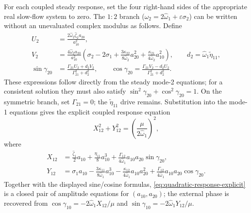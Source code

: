 \documentclass[11pt]{article}
\begin{document}
For each coupled steady response, set the four right-hand sides of the appropriate real slow-flow system to zero. The $1{:}2$ branch ($\hat{\omega}_2=2\hat{\omega}_1+\varepsilon\sigma_2$) can be written without an unevaluated complex modulus as follows. Define
\begin{align*}
U_2&=\frac{2\hat{\omega}_2\hat{\zeta}_2a_{20}}{a_{10}^2},\\
V_2&=\frac{4\hat{\omega}_2a_{20}}{a_{10}^2}\left(\sigma_2-2\sigma_1+\frac{3\kappa_{22}}{8\hat{\omega}_2}a_{20}^2+\frac{\kappa_{21}}{4\hat{\omega}_2}a_{10}^2\right),\qquad d_2=\hat{\omega}_1\tilde{\eta}_{11},\\
\sin\gamma_{20}&=\frac{\Gamma_{21}U_2+d_2V_2}{\Gamma_{21}^2+d_2^2},\qquad
\cos\gamma_{20}=\frac{\Gamma_{21}V_2-d_2U_2}{\Gamma_{21}^2+d_2^2}.
\end{align*}
These expressions follow directly from the steady mode-2 equations; for a consistent solution they must also satisfy $\sin^2\gamma_{20}+\cos^2\gamma_{20}=1$. On the symmetric branch, set $\Gamma_{21}=0$; the $\tilde{\eta}_{11}$ drive remains. Substitution into the mode-1 equations gives the explicit coupled response equation
\begin{equation}\label{eq:quadratic-response-explicit}
X_{12}^2+Y_{12}^2=\left(\frac{\mu}{2\hat{\omega}_1}\right)^2,
\end{equation}
where
\begin{align*}
X_{12}&=\frac{\hat{\zeta}_1}{2}a_{10}+\frac{\eta_{11}}{8}a_{10}^3+\frac{\Gamma_{12}}{4\hat{\omega}_1}a_{10}a_{20}\sin\gamma_{20},\\
Y_{12}&=\sigma_1a_{10}-\frac{3\kappa_{11}}{8\hat{\omega}_1}a_{10}^3-\frac{\kappa_{12}}{4\hat{\omega}_1}a_{10}a_{20}^2+\frac{\Gamma_{12}}{4\hat{\omega}_1}a_{10}a_{20}\cos\gamma_{20}.
\end{align*}
Together with the displayed sine/cosine formulas, \eqref{eq:quadratic-response-explicit} is a closed pair of amplitude equations for $(a_{10},a_{20})$; the external phase is recovered from $\cos\gamma_{10}=-2\hat{\omega}_1X_{12}/\mu$ and $\sin\gamma_{10}=-2\hat{\omega}_1Y_{12}/\mu$.
\end{document}
